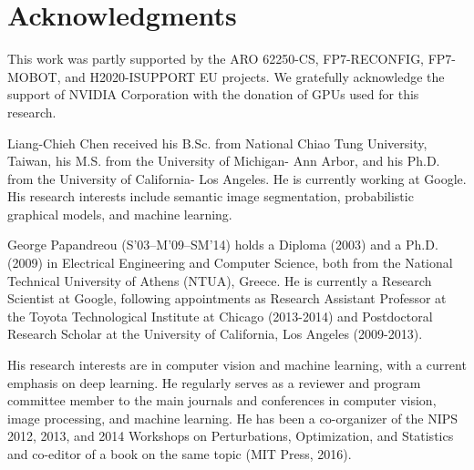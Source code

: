 \documentclass[10pt,journal,compsoc]{IEEEtran}
\begin{document}
\section*{Acknowledgments}
This work was partly supported by the ARO 62250-CS, FP7-RECONFIG, FP7-MOBOT, and H2020-ISUPPORT EU projects. We gratefully acknowledge the support of NVIDIA Corporation with the donation of GPUs used for this research.

 













 



\ifCLASSOPTIONcaptionsoff
  \newpage
\fi







{


}




\begin{IEEEbiography}{Liang-Chieh Chen}
received his B.Sc. from National Chiao Tung University, Taiwan, his M.S. from the University of Michigan- Ann Arbor, and his
Ph.D. from the University of California- Los Angeles. He is currently working at Google. His research interests
include semantic image segmentation, probabilistic graphical models, and machine learning.
\end{IEEEbiography}

\begin{IEEEbiography}{George Papandreou}
(S'03--M'09--SM'14) holds a Diploma (2003) and a Ph.D. (2009) in Electrical
Engineering and Computer Science, both from the National Technical University
of Athens (NTUA), Greece. He is currently a Research Scientist at Google,
following appointments as Research Assistant Professor at the Toyota
Technological Institute at Chicago (2013-2014) and Postdoctoral Research Scholar
at the University of California, Los Angeles (2009-2013).

His research interests are in computer vision and machine learning, with a
current emphasis on deep learning. He regularly serves as a reviewer and
program committee member to the main journals and conferences in computer
vision, image processing, and machine learning. He has been a co-organizer of
the NIPS 2012, 2013, and 2014 Workshops on Perturbations, Optimization, and
Statistics and co-editor of a book on the same topic (MIT Press, 2016).
\end{IEEEbiography}
\end{document}
